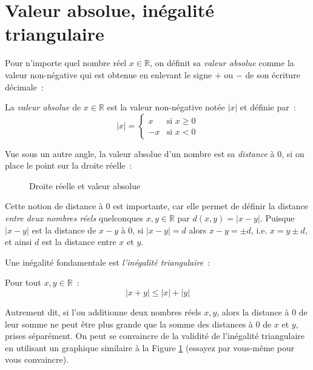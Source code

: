 \section{Valeur absolue, inégalité triangulaire}
Pour n'importe quel nombre réel $x \in \mathbb{R}$, on définit sa \emph{valeur absolue} comme la valeur non-négative qui est obtenue en enlevant le signe $+$ ou $-$ de son écriture décimale~:
\begin{boxdef}
La \emph{valeur absolue} de $x \in \mathbb{R}$ est la valeur non-négative notée $|x|$ et définie par~:
\begin{equation}
|x| = \begin{cases}
x & \textrm{si } x \geq 0 \\
-x & \textrm{si } x < 0
\end{cases}
\end{equation}
\end{boxdef}
Vue sous un autre angle, la valeur absolue d'un nombre est sa \emph{distance} à 0, si on place le point sur la droite réelle~:
\begin{figure}[H]
    \centering
    \caption{Droite réelle et valeur absolue}
    \label{fig:abs_real_axis}
\end{figure}
Cette notion de distance à 0 est importante, car elle permet de définir la distance \emph{entre deux nombres réels} quelconques $x, y \in \mathbb{R}$ par $d(x, y) = |x - y|$. Puisque $|x-y|$ est la distance de $x - y$ à 0, si $|x-y| = d$ alors $x - y = \pm d$, i.e. $x = y \pm d$, et ainsi $d$ est la distance entre $x$ et $y$.

Une inégalité fondamentale est \emph{l'inégalité triangulaire}~:
\begin{boxdef}
Pour tout $x, y \in \mathbb{R}$~:
\begin{equation}
|x + y| \leq |x| + |y|
\end{equation}
\end{boxdef}
Autrement dit, si l'on additionne deux nombres réels $x, y$, alors la distance à 0 de leur somme ne peut être plus grande que la somme des distances à 0 de $x$ et $y$, prises séparément. On peut se convaincre de la validité de l'inégalité triangulaire en utilisant un graphique similaire à la Figure \ref{fig:abs_real_axis} (essayez par vous-même pour vous convaincre).
